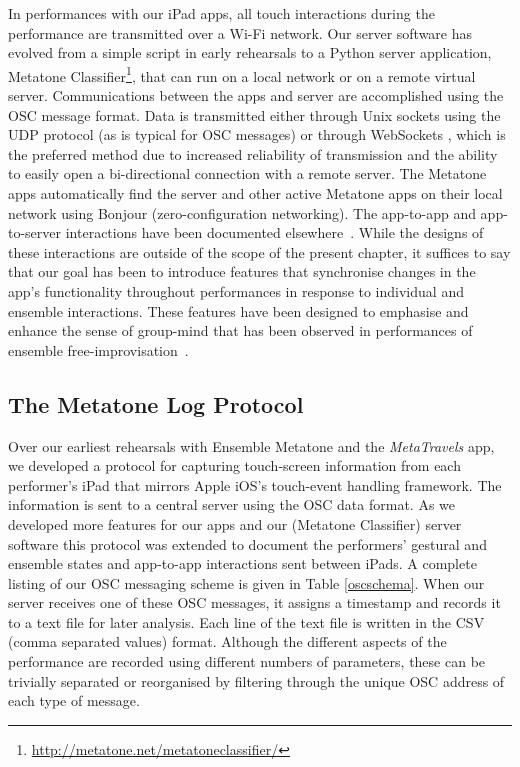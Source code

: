 \documentclass[graybox]{svmult}
\begin{document}
In performances with our iPad apps, all touch interactions during the
performance are transmitted over a Wi-Fi network. Our server software
has evolved from a simple script in early rehearsals to a Python
server application, Metatone
Classifier\footnote{\url{http://metatone.net/metatoneclassifier/}},
that can run on a local network or on a remote virtual server.
Communications between the apps and server are accomplished using the
OSC message format. Data is
transmitted either through Unix sockets using the UDP protocol (as is
typical for OSC messages) or through WebSockets \citep{Fette:2011eu},
which is the preferred method due to increased reliability of
transmission and the ability to easily open a bi-directional
connection with a remote server. The Metatone apps automatically find
the server and other active Metatone apps on their local network using
Bonjour (zero-configuration networking). The app-to-app and app-to-server
interactions have 
been documented elsewhere~\citep{Martin:2015mz,Martin:2015jk}. While
the designs of these interactions are outside of the scope of the
present chapter, it suffices to say that our goal has been to
introduce features that synchronise changes in the app's functionality
throughout performances in response to individual and ensemble
interactions. These features have been designed to emphasise and enhance the
sense of group-mind that has been observed in performances of ensemble
free-improvisation~\citep{Borgo:2006fv}. 

\subsection{The Metatone Log Protocol}
\label{subsec:metatone-log}

Over our earliest rehearsals with Ensemble Metatone and the
\emph{MetaTravels} app, we developed a protocol for capturing
touch-screen information from each performer's iPad that mirrors Apple
iOS's touch-event handling framework. The information is sent to a
central server using the OSC data format. As we developed more
features for our apps and our (Metatone Classifier) server software
this protocol was extended to document the performers' gestural and
ensemble states and app-to-app interactions sent between iPads. A
complete listing of our OSC messaging scheme is given in Table
\ref{oscschema}. When our server receives one of these OSC messages,
it assigns a timestamp and records it to a text file for later
analysis. Each line of the text file is written in the CSV (comma
separated values) format. Although the different aspects of the
performance are recorded using different numbers of parameters, these
can be trivially separated or reorganised by filtering through the
unique OSC address of each type of message.
\end{document}

